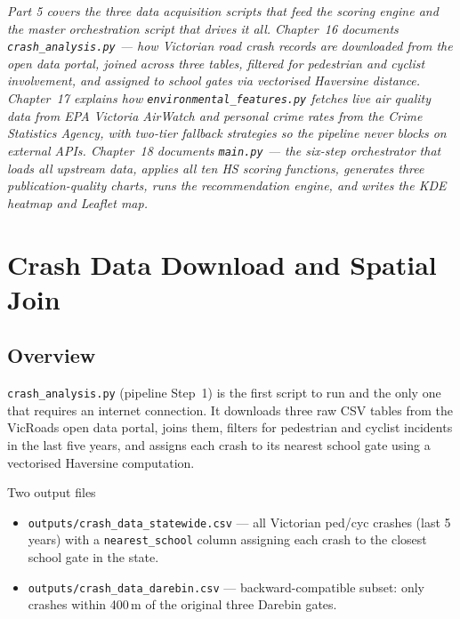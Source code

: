 \documentclass[11pt,a4paper,openany]{book}
\begin{document}
\begin{center}
\vspace{1cm}
{\large\itshape
Part 5 covers the three data acquisition scripts that feed the scoring engine
and the master orchestration script that drives it all.
Chapter~16 documents \texttt{crash\_analysis.py} --- how Victorian road crash
records are downloaded from the open data portal, joined across three tables,
filtered for pedestrian and cyclist involvement, and assigned to school gates
via vectorised Haversine distance.
Chapter~17 explains how \texttt{environmental\_features.py} fetches live air quality
data from EPA Victoria AirWatch and personal crime rates from the Crime Statistics
Agency, with two-tier fallback strategies so the pipeline never blocks on external APIs.
Chapter~18 documents \texttt{main.py} --- the six-step orchestrator that loads all
upstream data, applies all ten HS scoring functions, generates three publication-quality
charts, runs the recommendation engine, and writes the KDE heatmap and Leaflet map.
}
\vspace{1cm}
\end{center}

\chapter{Crash Data Download and Spatial Join}

\section{Overview}

\texttt{crash\_analysis.py} (pipeline Step~1) is the first script to run and the
only one that requires an internet connection.  It downloads three raw CSV tables
from the VicRoads open data portal, joins them, filters for pedestrian and cyclist
incidents in the last five years, and assigns each crash to its nearest school gate
using a vectorised Haversine computation.

\begin{keybox}{Two output files}
\begin{itemize}
  \item \texttt{outputs/crash\_data\_statewide.csv} --- all Victorian ped/cyc crashes
        (last 5 years) with a \texttt{nearest\_school} column assigning each crash
        to the closest school gate in the state.
  \item \texttt{outputs/crash\_data\_darebin.csv} --- backward-compatible subset:
        only crashes within 400\,m of the original three Darebin gates.
\end{itemize}
\end{keybox}
\end{document}
